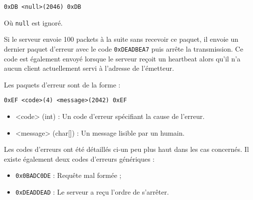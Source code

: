 \documentclass[a4paper,10pt,openany,oneside]{report}
\begin{document}
\begin{verbatim}
0xDB <null>(2046) 0xDB
\end{verbatim}

Où \texttt{null} est ignoré.

Si le serveur envoie 100 packets à la suite sans recevoir ce paquet, il envoie
un dernier paquet d'erreur avec le code \texttt{0xDEADBEA7} puis arrête la
transmission. Ce code est également envoyé lorsque le serveur reçoit un
heartbeat alors qu'il n'a aucun client actuellement servi à l'adresse de
l'émetteur.

Les paquets d'erreur sont de la forme :

\begin{verbatim}
0xEF <code>(4) <message>(2042) 0xEF
\end{verbatim}

\begin{itemize}
    \item <code> (int) : Un code d'erreur spécifiant la cause de l'erreur.
    \item <message> (char[]) : Un message lisible par un humain.
\end{itemize}

Les codes d'erreurs ont été détaillés ci-un peu plus haut dans les cas
concernés. Il existe également deux codes d'erreurs génériques :

\begin{itemize}
    \item \texttt{0x0BADC0DE} : Requête mal formée ;
    \item \texttt{0xDEADDEAD} : Le serveur a reçu l'ordre de s'arrêter.
\end{itemize}
\end{document}
